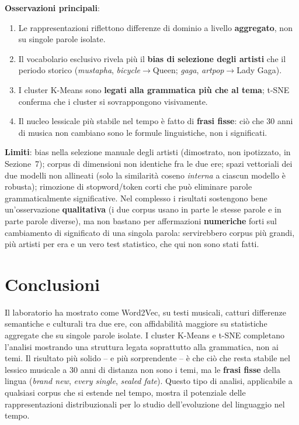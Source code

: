 \documentclass[12pt,a4paper]{article}
\begin{document}
\textbf{Osservazioni principali}:
\begin{enumerate}[itemsep=1pt]
  \item Le rappresentazioni riflettono differenze di dominio a livello \textbf{aggregato}, non su singole parole isolate.
  \item Il vocabolario esclusivo rivela pi\`u il \textbf{bias di selezione degli artisti} che il periodo storico (\textit{mustapha}, \textit{bicycle}$\to$Queen; \textit{gaga}, \textit{artpop}$\to$Lady Gaga).
  \item I cluster K-Means sono \textbf{legati alla grammatica pi\`u che al tema}; t-SNE conferma che i cluster si sovrappongono visivamente.
  \item Il nucleo lessicale pi\`u stabile nel tempo \`e fatto di \textbf{frasi fisse}: ci\`o che 30 anni di musica non cambiano sono le formule linguistiche, non i significati.
\end{enumerate}

\textbf{Limiti}: bias nella selezione manuale degli artisti (dimostrato, non ipotizzato, in Sezione~7); corpus di dimensioni non identiche fra le due ere; spazi vettoriali dei due modelli non allineati (solo la similarit\`a coseno \emph{interna} a ciascun modello \`e robusta); rimozione di stopword/token corti che pu\`o eliminare parole grammaticalmente significative. Nel complesso i risultati sostengono bene un'osservazione \textbf{qualitativa} (i due corpus usano in parte le stesse parole e in parte parole diverse), ma non bastano per affermazioni \textbf{numeriche} forti sul cambiamento di significato di una singola parola: servirebbero corpus pi\`u grandi, pi\`u artisti per era e un vero test statistico, che qui non sono stati fatti.

\section{Conclusioni}

Il laboratorio ha mostrato come Word2Vec, su testi musicali, catturi differenze semantiche e culturali tra due ere, con affidabilit\`a maggiore su statistiche aggregate che su singole parole isolate. I cluster K-Means e t-SNE completano l'analisi mostrando una struttura legata soprattutto alla grammatica, non ai temi. Il risultato pi\`u solido -- e pi\`u sorprendente -- \`e che ci\`o che resta stabile nel lessico musicale a 30 anni di distanza non sono i temi, ma le \textbf{frasi fisse} della lingua (\textit{brand new}, \textit{every single}, \textit{sealed fate}). Questo tipo di analisi, applicabile a qualsiasi corpus che si estende nel tempo, mostra il potenziale delle rappresentazioni distribuzionali per lo studio dell'evoluzione del linguaggio nel tempo.
\end{document}
